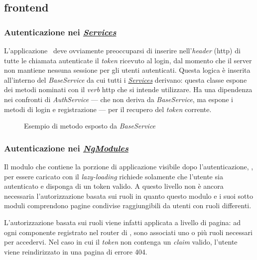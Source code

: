 \subsection{\Gls{frontend}}
\label{chap:client:authentication}
\subsubsection{Autenticazione nei \textit{\hyperref[client:services]{Services}}}
L'applicazione \angular~deve ovviamente preoccuparsi di inserire nell'\textit{header} (\acrshort{http}) di tutte le chiamata autenticate il \textit{token} ricevuto al login, dal momento che il server non mantiene nessuna sessione per gli utenti autenticati. Questa logica è inserita all'interno del \textit{BaseService} da cui tutti i \textit{\hyperref[client:services]{Services}} derivano: questa classe espone dei metodi nominati con il \textit{verb} \acrshort{http} che si intende utilizzare. Ha una dipendenza nei confronti di \textit{AuthService} --- che non deriva da \textit{BaseService}, ma espone i metodi di login e registrazione --- per il recupero del \textit{token} corrente.

\begin{figure}[H] 
	\centering    
	
	\caption[Esempio di metodo esposto da \textit{BaseService}]{Esempio di metodo esposto da \textit{BaseService}}
	\label{fig:client-auth-base-service}
\end{figure}

\subsubsection{Autenticazione nei \textit{\hyperref[client:modules]{NgModules}}}

Il modulo che contiene la porzione di applicazione visibile dopo l'autenticazione, \textit{}, per essere caricato con il \textit{lazy-loading} richiede solamente che l'utente sia autenticato e disponga di un token valido. A questo livello non è ancora necessaria l'autorizzazione basata sui ruoli in quanto questo modulo e i suoi sotto moduli comprendono pagine condivise raggiungibili da utenti con ruoli differenti.

L'autorizzazione basata sui ruoli viene infatti applicata a livello di pagina: ad ogni componente registrato nel router di \angular, sono associati uno o più ruoli necessari per accedervi. Nel caso in cui il \textit{token} non contenga un \textit{claim} valido, l'utente viene reindirizzato in una pagina di errore 404.

